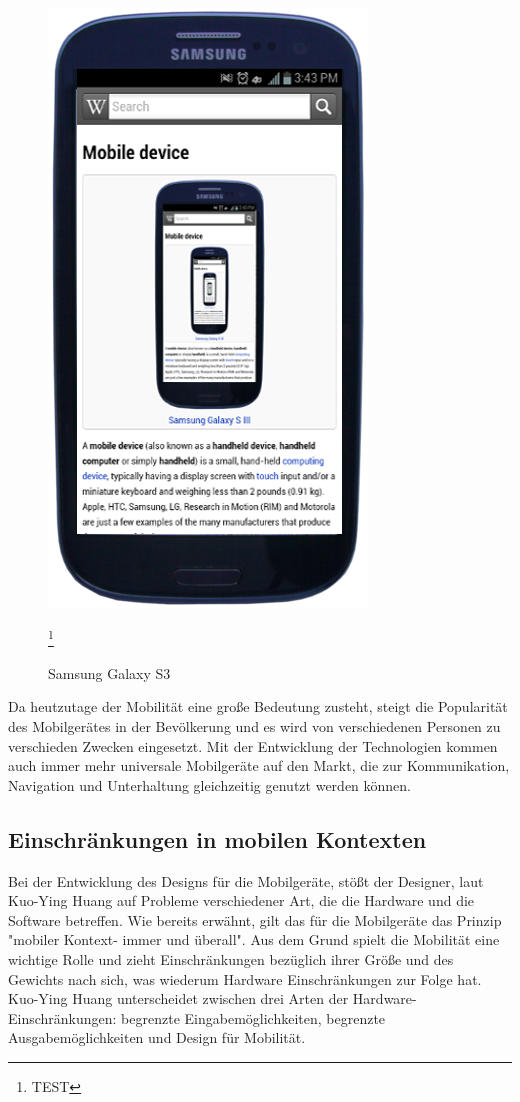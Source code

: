  \begin{figure}[h]
 \centering
 \includegraphics[height=0.25\textheight]{img/Samsung_Galaxy_S_III_Pebble_Blue_WikiWikipedia.png}
 \caption{Samsung Galaxy S3} \footnote{TEST}
\end{figure}

Da heutzutage der Mobilität eine große Bedeutung zusteht, steigt die Popularität des Mobilgerätes in der Bevölkerung und es wird von verschiedenen Personen zu verschieden Zwecken eingesetzt.  Mit der Entwicklung der Technologien kommen auch immer mehr universale Mobilgeräte auf den Markt, die zur Kommunikation, Navigation und Unterhaltung gleichzeitig genutzt werden können. 


\subsection{Einschränkungen in mobilen Kontexten} %
\label{sub:einschr_nkungen_in_mobilen_kontexten}
Bei der Entwicklung des Designs für die Mobilgeräte, stößt der Designer, laut Kuo-Ying Huang auf Probleme verschiedener Art, die die Hardware und die Software betreffen. 
Wie bereits erwähnt, gilt das für die Mobilgeräte das Prinzip "mobiler Kontext- immer und überall". Aus dem Grund spielt die Mobilität eine wichtige Rolle und zieht Einschränkungen bezüglich ihrer Größe und des Gewichts nach sich, was wiederum Hardware Einschränkungen zur Folge hat. Kuo-Ying Huang  unterscheidet zwischen drei Arten der Hardware-Einschränkungen: begrenzte Eingabemöglichkeiten, begrenzte Ausgabemöglichkeiten und Design für Mobilität.

